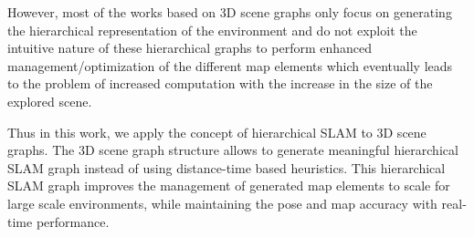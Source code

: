 However, most of the works based on 3D scene graphs only focus on generating the hierarchical representation of the environment and do not exploit the intuitive nature of these hierarchical graphs to perform enhanced management/optimization of the different map elements which eventually leads to the problem of increased computation with the increase in the size of the explored scene. 

Thus in this work, we apply the concept of hierarchical SLAM to 3D scene graphs. The 3D scene graph structure allows to generate meaningful hierarchical SLAM graph instead of using distance-time based heuristics. This hierarchical SLAM graph improves the management of generated map elements to scale for large scale environments, while maintaining the pose and map accuracy with real-time performance.